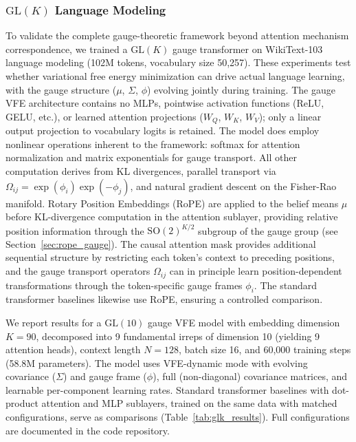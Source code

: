 \documentclass[twoside,11pt]{article}
\begin{document}
\subsubsection{$\mathrm{GL}(K)$ Language Modeling}
\label{sec:experimental_design_glk}

To validate the complete gauge-theoretic framework beyond attention mechanism correspondence, we trained a $\mathrm{GL}(K)$ gauge transformer on WikiText-103 language modeling (102M tokens, vocabulary size 50,257). These experiments test whether variational free energy minimization can drive actual language learning, with the gauge structure ($\mu$, $\Sigma$, $\phi$) evolving jointly during training. The gauge VFE architecture contains no MLPs, pointwise activation functions (ReLU, GELU, etc.), or learned attention projections ($W_Q$, $W_K$, $W_V$); only a linear output projection to vocabulary logits is retained. The model does employ nonlinear operations inherent to the framework: softmax for attention normalization and matrix exponentials for gauge transport. All other computation derives from KL divergences, parallel transport via $\Omega_{ij} = \exp(\phi_i) \exp(-\phi_j)$, and natural gradient descent on the Fisher-Rao manifold. Rotary Position Embeddings (RoPE) \citep{su2024roformer} are applied to the belief means $\mu$ before KL-divergence computation in the attention sublayer, providing relative position information through the $\mathrm{SO}(2)^{K/2}$ subgroup of the gauge group (see Section~\ref{sec:rope_gauge}). The causal attention mask provides additional sequential structure by restricting each token's context to preceding positions, and the gauge transport operators $\Omega_{ij}$ can in principle learn position-dependent transformations through the token-specific gauge frames $\phi_i$. The standard transformer baselines likewise use RoPE, ensuring a controlled comparison.

We report results for a $\mathrm{GL}(10)$ gauge VFE model with embedding dimension $K = 90$, decomposed into 9 fundamental irreps of dimension 10 (yielding 9 attention heads), context length $N = 128$, batch size 16, and 60{,}000 training steps (58.8M parameters). The model uses VFE-dynamic mode with evolving covariance ($\Sigma$) and gauge frame ($\phi$), full (non-diagonal) covariance matrices, and learnable per-component learning rates. Standard transformer baselines with dot-product attention and MLP sublayers, trained on the same data with matched configurations, serve as comparisons (Table~\ref{tab:glk_results}). Full configurations are documented in the code repository.
\end{document}
